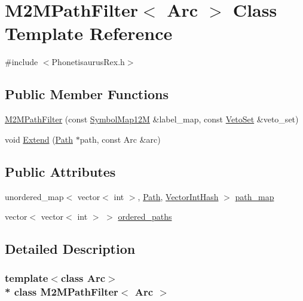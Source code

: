\hypertarget{class_m2_m_path_filter}{}\section{M2\+M\+Path\+Filter$<$ Arc $>$ Class Template Reference}
\label{class_m2_m_path_filter}


{\ttfamily \#include $<$Phonetisaurus\+Rex.\+h$>$}

\subsection*{Public Member Functions}
\begin{DoxyCompactItemize}
\item 
\hyperlink{class_m2_m_path_filter_aebf9df8cf1da7a142a3a0bfa1be25080}{M2\+M\+Path\+Filter} (const \hyperlink{_phonetisaurus_rex_8h_a1b8d3cfde7f91bb07908a765d0afa44f}{Symbol\+Map12M} \&label\+\_\+map, const \hyperlink{_phonetisaurus_rex_8h_a667adafd2242ec30095948e6176168f2}{Veto\+Set} \&veto\+\_\+set)
\item 
void \hyperlink{class_m2_m_path_filter_ac821b005c370b2be0c8a960ba3e156b7}{Extend} (\hyperlink{struct_path}{Path} $\ast$path, const Arc \&arc)
\end{DoxyCompactItemize}
\subsection*{Public Attributes}
\begin{DoxyCompactItemize}
\item 
unordered\+\_\+map$<$ vector$<$ int $>$, \hyperlink{struct_path}{Path}, \hyperlink{struct_vector_int_hash}{Vector\+Int\+Hash} $>$ \hyperlink{class_m2_m_path_filter_aafc66538ae046055f483f8b661445145}{path\+\_\+map}
\item 
vector$<$ vector$<$ int $>$ $>$ \hyperlink{class_m2_m_path_filter_a9aa2add87bbbe3199cc5c89ce804bd27}{ordered\+\_\+paths}
\end{DoxyCompactItemize}


\subsection{Detailed Description}
\subsubsection*{template$<$class Arc$>$\\*
class M2\+M\+Path\+Filter$<$ Arc $>$}



